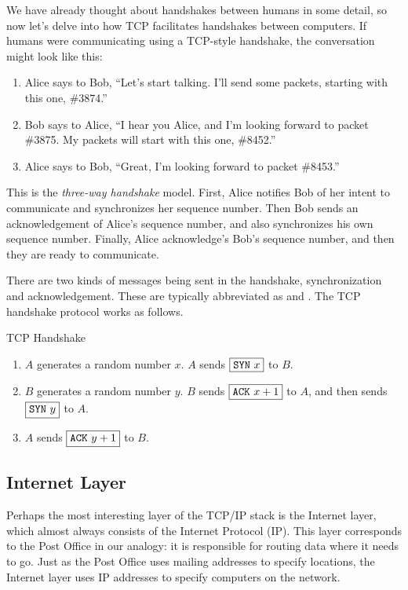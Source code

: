 We have already thought about handshakes between humans in some detail, so now let's delve into how TCP facilitates handshakes between computers. If humans were communicating using a TCP-style handshake, the conversation might look like this:
\begin{enumerate}
    \item Alice says to Bob, ``Let's start talking. I'll send some packets, starting with this one, \#3874.''
    \item Bob says to Alice, ``I hear you Alice, and I'm looking forward to packet \#3875. My packets will start with this one, \#8452.''
    \item Alice says to Bob, ``Great, I'm looking forward to packet \#8453.''
\end{enumerate}
This is the \emph{three-way handshake} model. First, Alice notifies Bob of her intent to communicate and synchronizes her sequence number. Then Bob sends an acknowledgement of Alice's sequence number, and also synchronizes his own sequence number. Finally, Alice acknowledge's Bob's sequence number, and then they are ready to communicate.

There are two kinds of messages being sent in the handshake, synchronization and acknowledgement. These are typically abbreviated as  and . The TCP handshake protocol works as follows.
\begin{graybox}
{\Large TCP Handshake}
\begin{enumerate}
    \item $A$ generates a random number $x$. $A$ sends $\boxed{\texttt{SYN}\ x}$ to $B$.
    \item $B$ generates a random number $y$. $B$ sends $\boxed{\texttt{ACK}\ x+1}$ to $A$, and then sends $\boxed{\texttt{SYN}\ y}$ to $A$.
    \item $A$ sends $\boxed{\texttt{ACK}\ y+1}$ to $B$.
\end{enumerate}
\end{graybox}

\subsection{Internet Layer}

Perhaps the most interesting layer of the TCP/IP stack is the Internet layer, which almost always consists of the Internet Protocol (IP). This layer corresponds to the Post Office in our analogy: it is responsible for routing data where it needs to go. Just as the Post Office uses mailing addresses to specify locations, the Internet layer uses IP addresses to specify computers on the network.

